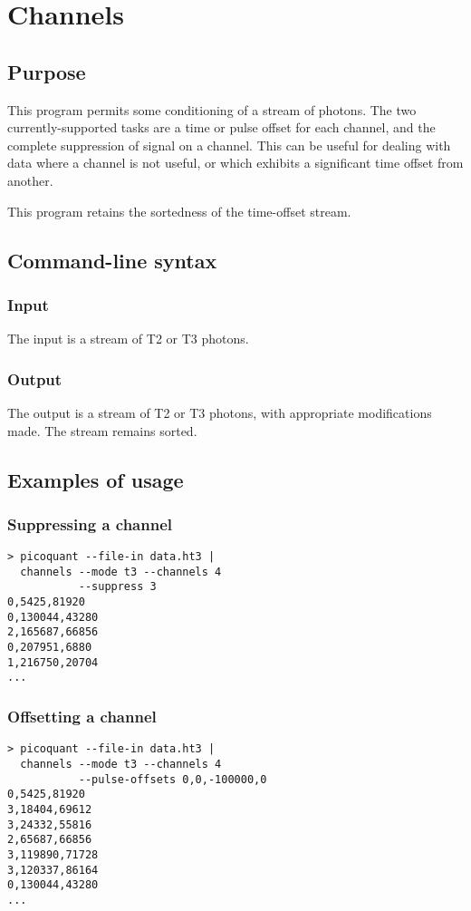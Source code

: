 \section{Channels}
\subsection{Purpose}
This program permits some conditioning of a stream of photons. The two currently-supported tasks are a time or pulse offset for each channel, and the complete suppression of signal on a channel. This can be useful for dealing with data where a channel is not useful, or which exhibits a significant time offset from another.

This program retains the sortedness of the time-offset stream.

\subsection{Command-line syntax}


\subsubsection{Input}
The input is a stream of T2 or T3 photons.

\subsubsection{Output}
The output is a stream of T2 or T3 photons, with appropriate modifications made. The stream remains sorted.

\subsection{Examples of usage}
\subsubsection{Suppressing a channel}
\begin{verbatim}
> picoquant --file-in data.ht3 |
  channels --mode t3 --channels 4 
           --suppress 3
0,5425,81920
0,130044,43280
2,165687,66856
0,207951,6880
1,216750,20704
...
\end{verbatim}

\subsubsection{Offsetting a channel}
\begin{verbatim}
> picoquant --file-in data.ht3 |
  channels --mode t3 --channels 4 
           --pulse-offsets 0,0,-100000,0
0,5425,81920
3,18404,69612
3,24332,55816
2,65687,66856
3,119890,71728
3,120337,86164
0,130044,43280
...
\end{verbatim}

